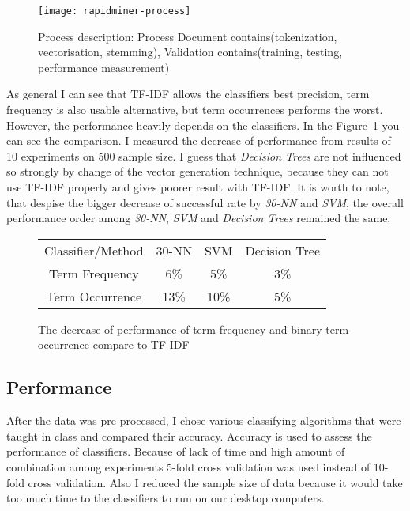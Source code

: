 \begin{figure}
\begin{center} 
\texttt{[image: rapidminer-process]}
\caption{Process description: Process Document contains(tokenization, vectorisation, stemming), Validation contains(training, testing, performance measurement)}
\end{center}
\end{figure}
As general I can see that TF-IDF allows the classifiers best precision, term frequency is also usable alternative, but term occurrences performs the worst.
However, the performance heavily depends on the classifiers.
In the Figure~\ref{fig:vectors} you can see the comparison. 
I measured the decrease of performance from results of 10 experiments on 500 sample size.
I guess that {\it Decision Trees} are not influenced so strongly by change of the vector generation
technique, because they can not use TF-IDF properly and gives poorer result with TF-IDF.
It is worth to note, that despise the bigger decrease of successful rate by {\it 30-NN} and {\it SVM},
the overall performance order among {\it 30-NN}, {\it SVM} and {\it Decision Trees} remained the same.
\begin{figure}
\begin{center}
\begin{tabular}{|c|c|c|c|}
\hline
Classifier/Method     & 30-NN  & SVM &  Decision Tree   \\
Term Frequency        & 6\%    & 5\% &    3\%  \\
Term Occurrence       & 13\%   & 10\% &   5\%  \\
\hline
\end{tabular}
\caption{\label{fig:vectors} The decrease of performance of term frequency and binary term occurrence compare to TF-IDF}
\end{center}
\end{figure}

\subsection*{Performance} %
\label{sub:Performance}
 After the data was pre-processed, I chose various classifying algorithms that were taught in class and compared their accuracy. Accuracy is used to assess the performance of classifiers. Because of lack of time and high amount of combination among experiments 5-fold cross validation was used instead of 10-fold cross validation. Also I reduced the sample size of data because it would take too much time to the classifiers to run on our desktop computers.

